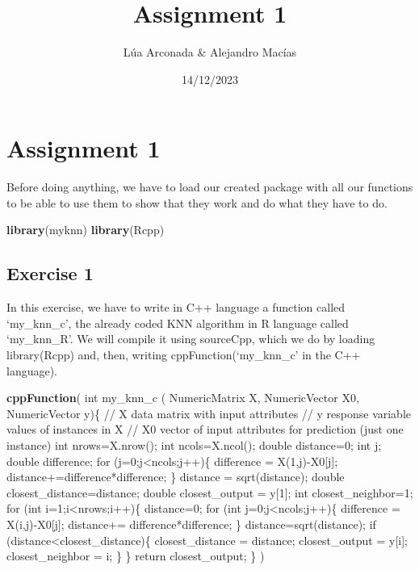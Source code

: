 \documentclass[
]{article}
\title{Assignment 1}
\author{Lúa Arconada \& Alejandro Macías}
\date{14/12/2023}
\newenvironment{Shaded}{\begin{snugshade}}{\end{snugshade}}
\newcommand{\FunctionTok}[1]{\textcolor[rgb]{0.13,0.29,0.53}{\textbf{#1}}}
\newcommand{\NormalTok}[1]{#1}
\newcommand{\StringTok}[1]{\textcolor[rgb]{0.31,0.60,0.02}{#1}}
\begin{document}
\maketitle

\hypertarget{assignment-1}{%
\section{Assignment 1}\label{assignment-1}}

Before doing anything, we have to load our created package with all our
functions to be able to use them to show that they work and do what they
have to do.

\begin{Shaded}
\begin{Highlighting}[]
\FunctionTok{library}\NormalTok{(myknn)}
\FunctionTok{library}\NormalTok{(Rcpp)}
\end{Highlighting}
\end{Shaded}

\hypertarget{exercise-1}{%
\subsection{Exercise 1}\label{exercise-1}}

In this exercise, we have to write in C++ language a function called
`my\_knn\_c', the already coded KNN algorithm in R language called
`my\_knn\_R'. We will compile it using sourceCpp, which we do by loading
library(Rcpp) and, then, writing cppFunction(`my\_knn\_c' in the C++
language).

\begin{Shaded}
\begin{Highlighting}[]
\FunctionTok{cppFunction}\NormalTok{(}\StringTok{\textquotesingle{}}
\StringTok{int my\_knn\_c ( NumericMatrix X, NumericVector X0, NumericVector y)\{}
\StringTok{  // X data matrix with input attributes}
\StringTok{  // y response variable values of instances in X  }
\StringTok{  // X0 vector of input attributes for prediction (just one instance)}
\StringTok{  int nrows=X.nrow();}
\StringTok{  int ncols=X.ncol();}
\StringTok{  double distance=0;}
\StringTok{  int j;}
\StringTok{  double difference;}
\StringTok{  for (j=0;j\textless{}ncols;j++)\{}
\StringTok{    difference = X(1,j){-}X0[j];}
\StringTok{    distance+=difference*difference;}
\StringTok{  \}}
\StringTok{  distance = sqrt(distance);}
\StringTok{  double closest\_distance=distance;}
\StringTok{  double closest\_output = y[1];}
\StringTok{  int closest\_neighbor=1;}
\StringTok{  for (int i=1;i\textless{}nrows;i++)\{}
\StringTok{    distance=0;}
\StringTok{    for (int j=0;j\textless{}ncols;j++)\{}
\StringTok{      difference = X(i,j){-}X0[j];}
\StringTok{      distance+= difference*difference;}
\StringTok{    \}}
\StringTok{    distance=sqrt(distance);}
\StringTok{    if (distance\textless{}closest\_distance)\{}
\StringTok{      closest\_distance = distance;}
\StringTok{      closest\_output = y[i];}
\StringTok{      closest\_neighbor = i;}
\StringTok{    \}}
\StringTok{  \}}
\StringTok{  return closest\_output;}
\StringTok{\}}
\StringTok{\textquotesingle{}}\NormalTok{)}
\end{Highlighting}
\end{Shaded}
\end{document}

